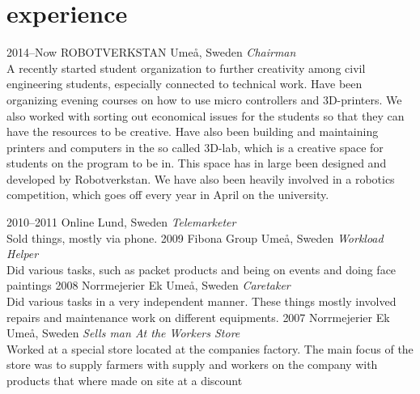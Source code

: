 \documentclass[]{friggeri-cv} %
\begin{document}

\section{experience}

\begin{entrylist}
\entry
{2014--Now}
{ROBOTVERKSTAN}
{Umeå, Sweden}
{\emph{Chairman} \\
A recently started student organization to further creativity among civil engineering students, especially connected to technical work. Have been organizing evening courses on how to use micro controllers and 3D-printers. We also worked with sorting out economical issues for the students so that they can have the resources to be creative. Have also been building and maintaining printers and computers in the so called 3D-lab, which is a creative space for students on the program to be in. This space has in large been designed and developed by Robotverkstan. We have also been heavily involved in a robotics competition, which goes off every year in April on the university.}

\entry
{2010--2011}
{Online}
{Lund, Sweden}
{\emph{Telemarketer} \\
Sold things, mostly via phone.}
\entry
{2009}
{Fibona Group}
{Umeå, Sweden}
{\emph{Workload Helper} \\
Did various tasks, such as packet products and being on events and doing face paintings}
\entry
{2008}
{Norrmejerier Ek}
{Umeå, Sweden}
{\emph{Caretaker} \\
Did various tasks in a very independent manner. These things mostly involved repairs and maintenance work on different equipments.}
\entry
{2007}
{Norrmejerier Ek}
{Umeå, Sweden}
{\emph{Sells man At the Workers Store} \\
Worked at a special store located at the companies factory. The main focus of the store was to supply farmers with supply and workers on the company with products that where made on site at a discount}
\end{entrylist}

\end{document}
